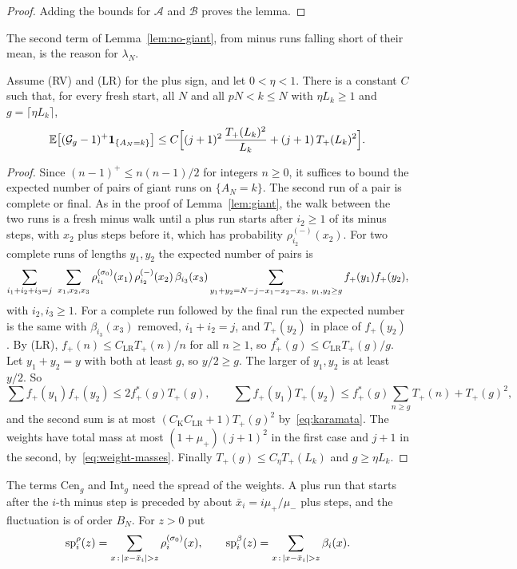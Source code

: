 \begin{proof}
Adding the bounds for $\mathcal A$ and $\mathcal B$ proves the lemma.
\end{proof}

The second term of Lemma~\ref{lem:no-giant}, from minus runs falling short of their
mean, is the reason for $\lambda_N$.

\begin{lemma}\label{lem:two-giant}
Assume (RV) and (LR) for the plus sign, and let $0<\eta<1$. There is a constant
$C$ such that, for every fresh start, all $N$ and all $pN<k\le N$ with
$\eta L_k\ge1$ and $g=\lceil\eta L_k\rceil$,
\[
 \mathbb{E}\bigl[(\mathcal G_g-1)^+\mathbf{1}_{\{A_N=k\}}\bigr]\le C\Bigl[(j+1)^2\,\frac{T_{+}(L_k)^2}{L_k}+(j+1)\,T_{+}(L_k)^2\Bigr].
\]
\end{lemma}

\begin{proof}
Since $(n-1)^+\le n(n-1)/2$ for integers $n\ge0$, it suffices to bound the
expected number of pairs of giant runs on $\{A_N=k\}$. The second run of a pair
is complete or final. As in the proof of Lemma~\ref{lem:giant}, the walk between
the two runs is a fresh minus walk until a plus run starts after $i_2\ge1$ of its
minus steps, with $x_2$ plus steps before it, which has probability
$\rho^{(\minus)}_{i_2}(x_2)$. For two complete runs of lengths $y_1,y_2$ the
expected number of pairs is
\[
 \sum_{i_1+i_2+i_3=j}\ \sum_{x_1,x_2,x_3}\rho^{(\sgn_0)}_{i_1}(x_1)\,\rho^{(\minus)}_{i_2}(x_2)\,\beta_{i_3}(x_3)
 \sum_{y_1+y_2=N-j-x_1-x_2-x_3,\ y_1,y_2\ge g}f_\plus(y_1)f_\plus(y_2),
\]
with $i_2,i_3\ge1$. For a complete run followed by the final run the expected
number is the same with $\beta_{i_3}(x_3)$ removed, $i_1+i_2=j$, and $T_\plus(y_2)$
in place of $f_\plus(y_2)$. By (LR), $f_\plus(n)\le C_{\mathrm{LR}}T_\plus(n)/n$ for all $n\ge1$,
so $f^*_\plus(g)\le C_{\mathrm{LR}}T_\plus(g)/g$. Let $y_1+y_2=y$ with both at least
$g$, so $y/2\ge g$. The larger of $y_1,y_2$ is at least $y/2$. So
\[
 \sum f_\plus(y_1)f_\plus(y_2)\le2f^*_\plus(g)T_\plus(g),\qquad
 \sum f_\plus(y_1)T_\plus(y_2)\le f^*_\plus(g)\sum_{n\ge g}T_\plus(n)+T_\plus(g)^2,
\]
and the second sum is at most $(C_{\mathrm K}C_{\mathrm{LR}}+1)T_\plus(g)^2$ by~\eqref{eq:karamata}.
The weights have total mass at most $(1+\mu_\plus)(j+1)^2$ in the first case and
$j+1$ in the second, by~\eqref{eq:weight-masses}. Finally
$T_\plus(g)\le C_\eta T_\plus(L_k)$ and $g\ge\eta L_k$.
\end{proof}

The terms $\mathrm{Cen}_g$ and $\mathrm{Int}_g$ need the spread of the weights. A
plus run that starts after the $i$-th minus step is preceded by about
$\bar x_i=i\mu_\plus/\mu_\minus$ plus steps, and the fluctuation is of order $B_N$. For
$z>0$ put
\[
 \mathrm{sp}^\rho_i(z)=\sum_{x\,:\,|x-\bar x_i|>z}\rho^{(\sgn_0)}_i(x),\qquad
 \mathrm{sp}^\beta_i(z)=\sum_{x\,:\,|x-\bar x_i|>z}\beta_i(x).
\]

